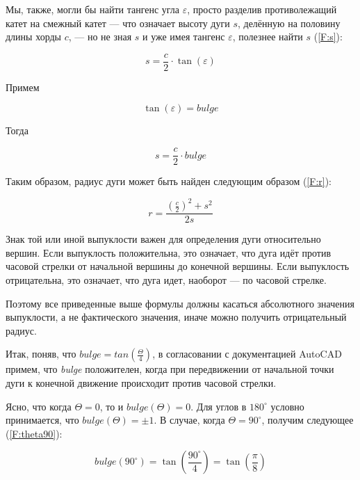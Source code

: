 Мы, также, могли бы найти тангенс угла $\varepsilon$, просто разделив противолежащий катет на смежный катет --- что означает высоту дуги $s$, делённую на половину длины хорды $c$, --- но не зная $s$ и уже имея тангенс $\varepsilon$, полезнее найти $s$ (\ref{F:s}):

\begin{equation}
	s=\frac{c}{2}\cdot\tan(\varepsilon)
	\label{F:s}
\end{equation}

Примем

\begin{equation}
	\tan(\varepsilon)=bulge
	\label{F:tanepsilon}
\end{equation}

Тогда

\begin{equation}
	s=\frac{c}{2}\cdot bulge
	\label{F:sfinal}
\end{equation}

Таким образом, радиус дуги может быть найден следующим образом (\ref{F:r}):

\begin{equation}
	r=\frac{(\frac{c}{2})^2+s^2}{2s}
	\label{F:r}
\end{equation}

Знак той или иной выпуклости важен для определения дуги относительно вершин. Если выпуклость положительна, это означает, что дуга идёт против часовой стрелки от начальной вершины до конечной вершины. Если выпуклость отрицательна, это означает, что дуга идет, наоборот --- по часовой стрелке.

Поэтому все приведенные выше формулы должны касаться абсолютного значения выпуклости, а не фактического значения, иначе можно получить отрицательный радиус.

Итак, поняв, что $bulge = tan(\frac{\Theta}{4})$, в согласовании с документацией AutoCAD \cite{Autodesk} примем, что \textit{bulge} положителен, когда при передвижении от начальной точки дуги к конечной движение происходит против часовой стрелки.

Ясно, что когда $\Theta=0$, то и $bulge(\Theta)=0$. Для углов в $180^{\circ}$ условно принимается, что $bulge(\Theta)=\pm1$. В случае, когда $\Theta=90^{\circ}$, получим следующее (\ref{F:theta90}):

\begin{equation}
	bulge(90^{\circ})= \tan(\frac{90^{\circ}}{4})=\tan(\frac{\pi}{8})
	\label{F:theta90}
\end{equation}

